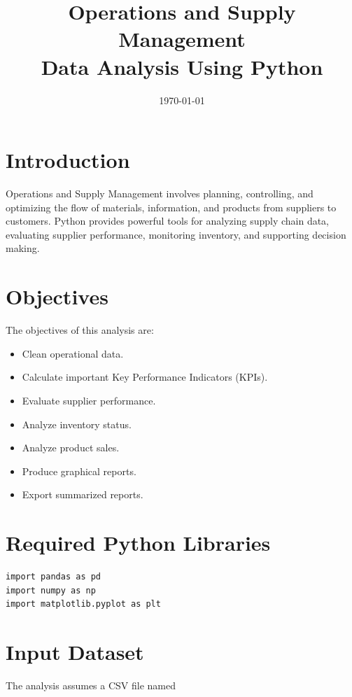 \documentclass[11pt,a4paper]{article}
\title{\Huge\bfseries Operations and Supply Management\\[0.3cm]
\Large Data Analysis Using Python}
\author{}
\date{\today}
\begin{document}
\maketitle

\tableofcontents

\newpage

\section{Introduction}

Operations and Supply Management involves planning, controlling, and optimizing the flow of materials, information, and products from suppliers to customers. Python provides powerful tools for analyzing supply chain data, evaluating supplier performance, monitoring inventory, and supporting decision making.

\section{Objectives}

The objectives of this analysis are:

\begin{itemize}
\item Clean operational data.
\item Calculate important Key Performance Indicators (KPIs).
\item Evaluate supplier performance.
\item Analyze inventory status.
\item Analyze product sales.
\item Produce graphical reports.
\item Export summarized reports.
\end{itemize}

\section{Required Python Libraries}

\begin{lstlisting}[style=pythonstyle]
import pandas as pd
import numpy as np
import matplotlib.pyplot as plt
\end{lstlisting}

\section{Input Dataset}

The analysis assumes a CSV file named
\end{document}
